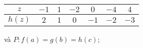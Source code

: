 \begin{enumerate}
   \noindent\begin{tabular}{|c|c|c|c|c|c|c|}
      \hline
      $z$ & $-1$ & $1$ & $-2$ & $0$ & $-4$ & $4$\\
      \hline
      $h(z)$ & $2$ & $1$ & $0$ & $-1$ & $-2$ & $-3$\\
      \hline
   \end{tabular} và $P:f(a) = g(b) = h(c)$;
\end{enumerate}

\solution[ex:hpt1]
